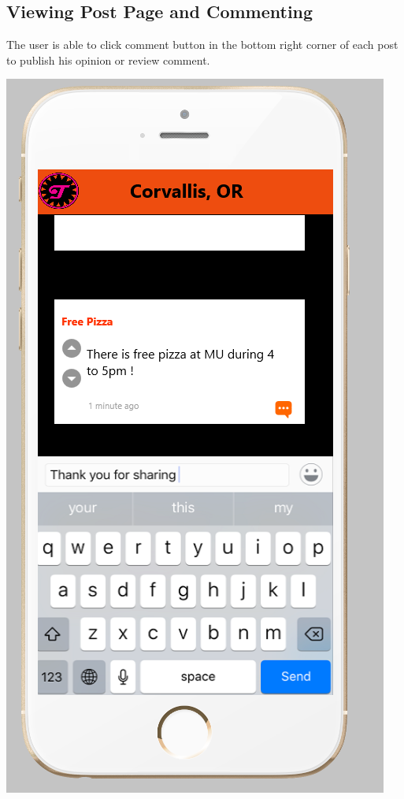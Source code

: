 \documentclass[12pt]{article}
\begin{document}
\subsection{Viewing Post Page and Commenting}
The user is able to click comment button in the bottom right corner of each post to publish his opinion or review comment.
\begin{center}
\includegraphics[scale=0.30]{img/ui/commentCreate}

\end{center}
\end{document}
